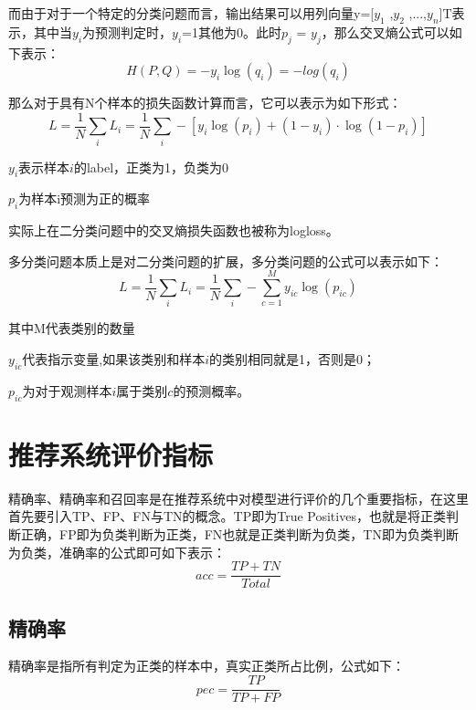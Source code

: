 而由于对于一个特定的分类问题而言，输出结果可以用列向量y=[$y_{1}$ ,$y_{2}$ ,...,$y_{n}$]$\mathrm{T}$表示，其中当$y_{i}$为预测判定时，$y_{i}$=1其他为0。此时$p_{j}$ = $y_{j}$，那么交叉熵公式可以如下表示：
\begin{equation}
  H(P, Q) = -y_{i}\log(q_{i}) = -log(q_{i})
\end{equation}

那么对于具有N个样本的损失函数计算而言，它可以表示为如下形式\cite{ZhihuCrossEntropyFormula}：
\begin{equation}
  L = \frac{1}{N}{\sum_{i} L_{i}} = \frac{1}{N}{\sum_{i} -[y_{i}\log(p_{i}) + (1 - y_{i}) \cdot {\log(1-p_{i})}]}
\end{equation}

$y_{i}$表示样本$i$的label，正类为1，负类为0

$p_{i}$为样本i预测为正的概率

实际上在二分类问题中的交叉熵损失函数也被称为logloss。

多分类问题本质上是对二分类问题的扩展，多分类问题的公式可以表示如下：
\begin{equation}
  L = \frac{1}{N}{\sum_{i} L_{i}} = \frac{1}{N}{\sum_{i} - \sum_{c=1}^{M}y_{ic}\log(p_{ic})}
\end{equation}



其中M代表类别的数量

$y_{ic}$代表指示变量,如果该类别和样本$i$的类别相同就是1，否则是0；

$p_{ic}$为对于观测样本$i$属于类别$c$的预测概率。

\section{推荐系统评价指标}

精确率、精确率和召回率是在推荐系统中对模型进行评价的几个重要指标，在这里首先要引入TP、FP、FN与TN的概念。TP即为True Positives，也就是将正类判断正确，FP即为负类判断为正类，FN也就是正类判断为负类，TN即为负类判断为负类，准确率的公式即可如下表示：
\begin{equation}
  acc = \frac{TP + TN}{Total}
\end{equation}

\subsection{精确率}

精确率是指所有判定为正类的样本中，真实正类所占比例，公式如下：
\begin{equation}
  pec = \frac{TP}{TP + FP}
\end{equation}


